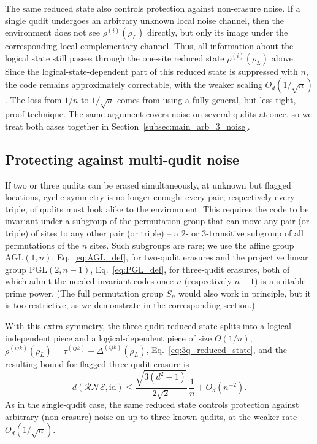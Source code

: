 \documentclass[10pt,twocolumn,superscriptaddress,aps,amsmath,amssymb,citeautoscript,floatfix,prx]{revtex4-2}
\theoremstyle{plain}
\theoremstyle{plain}
\theoremstyle{plain}
\theoremstyle{plain}
\theoremstyle{plain}
\theoremstyle{plain}
\theoremstyle{plain}
\theoremstyle{definition}
\theoremstyle{plain}
\begin{document}
The same reduced state also controls protection against non-erasure noise. If a single qudit undergoes an arbitrary unknown local noise channel, then the environment does not see $\rho^{(i)}(\rho_L)$ directly, 
but only its image under the corresponding local complementary channel. Thus, all information about the logical state still passes through the one-site reduced state $\rho^{(i)}(\rho_L)$ above. Since the logical-state-dependent part of this reduced state is suppressed with $n$, the code remains approximately correctable, with the weaker scaling $O_{d}(1/\sqrt n)$. The loss from $1/n$ to $1/\sqrt n$ comes from using a fully general, but less tight, proof technique. The same argument covers noise on several qudits at once, so we treat both cases together in Section~\ref{subsec:main_arb_3_noise}.
 
\subsection{Protecting against multi-qudit noise}\label{subsec:summary_multierasure}
 
If two or three qudits can be erased simultaneously, at unknown but flagged locations, cyclic symmetry is no longer enough: every pair, respectively every triple, of qudits must look alike to the environment. 
This requires the code to be invariant under a subgroup of the permutation group that can move any pair (or triple) of sites to any other pair (or triple) -- a $2$- or $3$-transitive subgroup of all permutations of the $n$ sites. 
Such subgroups are rare; we use the affine group $\mathrm{AGL}(1,n)$, Eq.~\eqref{eq:AGL_def}, for two-qudit erasures and the projective linear group $\mathrm{PGL}(2,n-1)$, Eq.~\eqref{eq:PGL_def}, 
for three-qudit erasures, both of which admit the needed invariant codes once $n$ (respectively $n-1$) is a suitable prime power. 
(The full permutation group $S_n$ would also work in principle, but it is too restrictive, as we demonstrate in the corresponding section.)
 
With this extra symmetry, the three-qudit reduced state splits into a logical-independent piece and a logical-dependent piece of size $\Theta(1/n)$, $\rho^{(ijk)}(\rho_L)=\tau^{(ijk)}+\Delta^{(ijk)}(\rho_L)$, Eq.~\eqref{eq:3q_reduced_state}, 
and the resulting bound for flagged three-qudit erasure is
$$
d(\mathcal R\mathcal N\mathcal E,\mathrm{id})\le \frac{\sqrt{3(d^2-1)}}{2\sqrt2}\,\frac1n+O_{d}(n^{-2}).
$$
As in the single-qudit case, the same reduced state controls protection against arbitrary (non-erasure) noise on up to three known qudits, at the weaker rate $O_{d}(1/\sqrt n)$.
\end{document}
